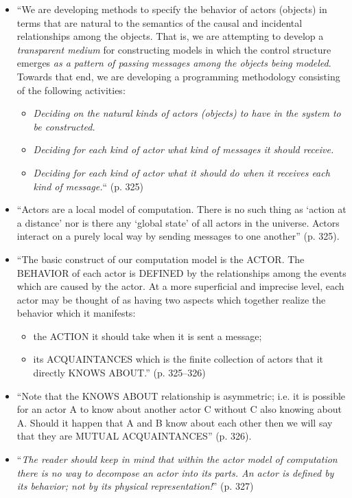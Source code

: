 \begin{itemize}
  \item ``We are developing methods to specify the behavior of actors (objects) in terms that are natural to the semantics of the causal and incidental relationships among the objects. That is, we are attempting to develop a \emph{transparent medium} for constructing models in which the control structure emerges \emph{as a pattern of passing messages among the objects being modeled}. Towards that end, we are developing a programming methodology consisting of the following activities:
    \begin{itemize}
      \item \emph{Deciding on the natural kinds of actors (objects) to have in the system to be constructed.}
	 \item \emph{Deciding for each kind of actor what kind of messages it should receive.}
	 \item \emph{Deciding for each kind of actor what it should do when it receives each kind of message.}`` (p. 325)
	\end{itemize}
  \item ``Actors are a local model of computation. There is no such thing as `action at a distance' nor is there any `global state' of all actors in the universe. Actors interact on a purely local way by sending messages to one another'' (p. 325).
  \item ``The basic construct of our computation model is the ACTOR. The BEHAVIOR of each actor is DEFINED by the relationships among the events which are caused by the actor. At a more superficial and imprecise level, each actor may be thought of as having two aspects which together realize the behavior which it manifests:
    \begin{itemize}
      \item the ACTION it should take when it is sent a message;
      \item its ACQUAINTANCES which is the finite collection of actors that it directly KNOWS ABOUT.'' (p. 325--326)
    \end{itemize}
  \item ``Note that the KNOWS ABOUT relationship is asymmetric; i.e. it is possible for an actor A to know about another actor C without C also knowing about A. Should it happen that A and B know about each other then we will say that they are MUTUAL ACQUAINTANCES'' (p. 326).
  \item ``\emph{The reader should keep in mind that within the actor model of computation there is no way to decompose an actor into its parts. An actor is defined by its behavior; not by its physical representation!}'' (p. 327)
\end{itemize}

